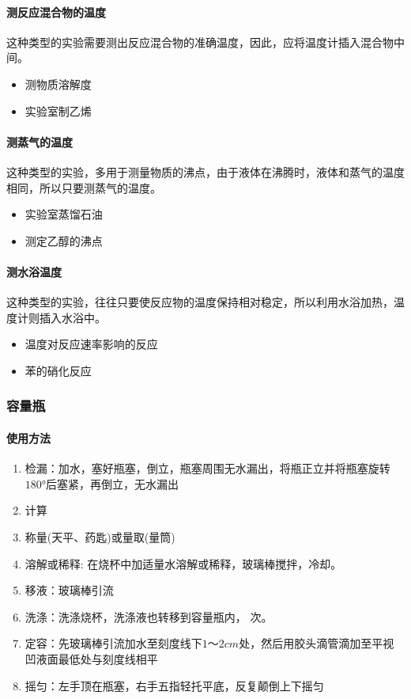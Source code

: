 \documentclass[a4paper]{article}
\begin{document}
	\paragraph{测反应混合物的温度}
	这种类型的实验需要测出反应混合物的准确温度，因此，应将温度计插入混合物中间。
	\begin{itemize}
		\item 测物质溶解度
		\item 实验室制乙烯
	\end{itemize}
	\paragraph{测蒸气的温度}
	这种类型的实验，多用于测量物质的沸点，由于液体在沸腾时，液体和蒸气的温度相同，所以只要测蒸气的温度。
	\begin{itemize}
		\item 实验室蒸馏石油
		\item 测定乙醇的沸点
	\end{itemize}
	\paragraph{测水浴温度}
	这种类型的实验，往往只要使反应物的温度保持相对稳定，所以利用水浴加热，温度计则插入水浴中。
	\begin{itemize}
		\item 温度对反应速率影响的反应
		\item 苯的硝化反应
	\end{itemize}
	
	\subsubsection{容量瓶}
	\paragraph{使用方法}
	\begin{enumerate}
		\item 检漏：加水，塞好瓶塞，倒立，瓶塞周围无水漏出，将瓶正立并将瓶塞旋转$\ang{180}$后塞紧，再倒立，无水漏出
		\item 计算
		\item 称量(天平、药匙)或量取(量筒)
		\item 溶解或稀释: 在烧杯中加适量水溶解或稀释，玻璃棒搅拌，冷却。
		\item 移液：玻璃棒引流
		\item 洗涤：洗涤烧杯，洗涤液也转移到容量瓶内， 次。
		\item 定容：先玻璃棒引流加水至刻度线下$1～2cm$处，然后用胶头滴管滴加至平视凹液面最低处与刻度线相平
		\item 摇匀：左手顶在瓶塞，右手五指轻托平底，反复颠倒上下摇匀
	\end{enumerate}
\end{document}
